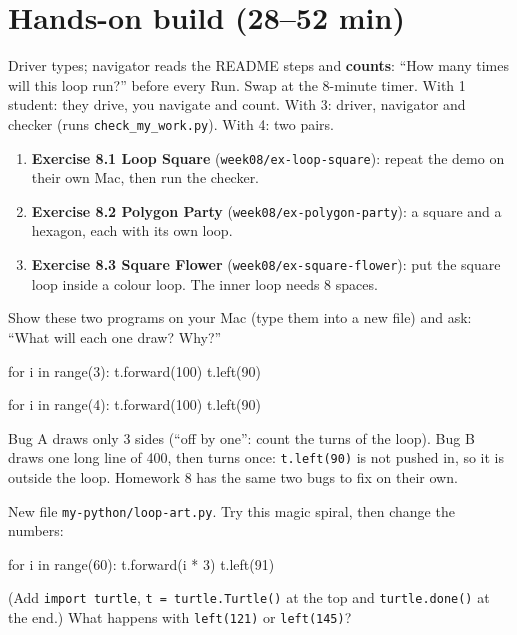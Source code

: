 \section{Hands-on build (28--52 min)}
\begin{pairroles}
Driver types; navigator reads the README steps and \textbf{counts}: \enquote{How many times will this loop run?} before every Run. Swap at the 8-minute timer.
With 1 student: they drive, you navigate and count. With 3: driver, navigator and checker (runs \texttt{check\_my\_work.py}). With 4: two pairs.
\end{pairroles}
\begin{enumerate}[leftmargin=1.4em,itemsep=2pt]
  \item \textbf{Exercise 8.1 Loop Square} (\texttt{week08/ex-loop-square}): repeat the demo on their own Mac, then run the checker.
  \item \textbf{Exercise 8.2 Polygon Party} (\texttt{week08/ex-polygon-party}): a square and a hexagon, each with its own loop.
  \item \textbf{Exercise 8.3 Square Flower} (\texttt{week08/ex-square-flower}): put the square loop inside a colour loop. The inner loop needs 8 spaces.
\end{enumerate}
\begin{bughunt}
Show these two programs on your Mac (type them into a new file) and ask: \enquote{What will each one draw? Why?}
\begin{pycode}[Bug A]
for i in range(3):
    t.forward(100)
    t.left(90)
\end{pycode}
\begin{pycode}[Bug B]
for i in range(4):
    t.forward(100)
t.left(90)
\end{pycode}
Bug A draws only 3 sides (\enquote{off by one}: count the turns of the loop). Bug B draws one long line of 400, then turns once: \texttt{t.left(90)} is not pushed in, so it is outside the loop. Homework 8 has the same two bugs to fix on their own.
\end{bughunt}
\begin{freebuild}
New file \texttt{my-python/loop-art.py}. Try this magic spiral, then change the numbers:
\begin{pycode}
for i in range(60):
    t.forward(i * 3)
    t.left(91)
\end{pycode}
(Add \texttt{import turtle}, \texttt{t = turtle.Turtle()} at the top and \texttt{turtle.done()} at the end.) What happens with \texttt{left(121)} or \texttt{left(145)}?
\end{freebuild}


